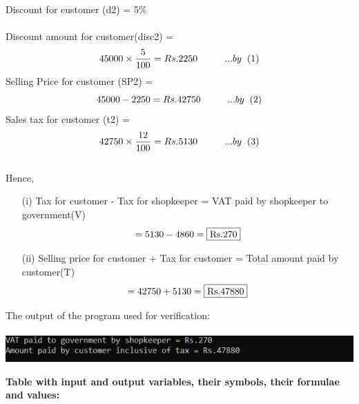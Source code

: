 \documentclass[12pt, twocolumn]{article}
\begin{document}
Discount for customer (d2) = 5\% \\ \\
Discount amount for customer(disc2)  = 
\begin{equation*} 
     45000\times\frac{5}{100} = Rs.2250 \hspace{1cm}... by \hspace{0.2cm} (1)
    \end{equation*}
Selling Price for customer (SP2) = \begin{equation*}\\
    45000 - 2250 =  Rs.42750 \hspace{1cm}... by \hspace{0.2cm} (2) 
\end{equation*}
Sales tax for customer (t2) = \begin{equation*}\\
    42750\times\frac{12}{100} = Rs.5130 \hspace{1cm}... by \hspace{0.2cm} (3)
\end{equation*} \\
Hence,
\begin{enumerate}
\item[(i)]Tax for customer - Tax for shopkeeper = 
    VAT paid by shopkeeper to government(V)  \\
     \begin{equation*}
        = 5130 - 4860 = \fbox{Rs.270}\\
     \end{equation*}
\item[(ii)]Selling price for customer + Tax for customer = Total amount paid by customer(T)\\ 
    \begin{equation*}
       = 42750 + 5130 = \fbox{Rs.47880}\\
   \end{equation*} 
\end{enumerate}
 The output of the program used for verification:\\ \\
\includegraphics[scale=1.1]{codeoutput.png} 
\begin{table}[h]
   \caption{\textbf{Table with input and output variables, their symbols, their formulae and values:}}
    \label{table:1}
   
\end{table}
\end{document}
